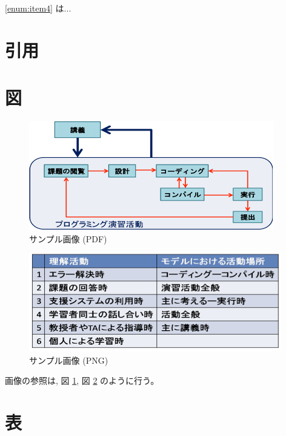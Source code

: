 \documentclass[dvipdfmx]{gakugei-doctoral-course-joint-seminar}
\begin{document}
\ref{enum:item4} は...

\section{引用}

\cite{miyalab-cls}

\cite{latex2e}

\section{図}

\begin{figure}[htbp]
\centering
\includegraphics[width=\linewidth]{image/sample.pdf}
	\caption{サンプル画像 (PDF)}
	\label{fig:sample-pdf}
\end{figure}

\begin{figure}[htbp]
\centering
\includegraphics[width=\linewidth]{image/sample.png}
	\caption{サンプル画像 (PNG)}
	\label{fig:sample-png}
\end{figure}

画像の参照は, 図 \ref{fig:sample-pdf}, 図 \ref{fig:sample-png} のように行う。

\section{表}
\end{document}
